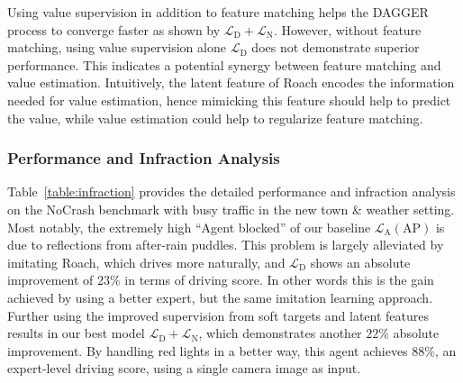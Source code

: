 Using value supervision in addition to feature matching helps the DAGGER process to converge faster as shown by $\mathcal{L}_\text{D} + \mathcal{L}_\text{N}$.
However, without feature matching, using value supervision alone $\mathcal{L}_\text{D}$ does not demonstrate superior performance.
This indicates a potential synergy between feature matching and value estimation.
Intuitively, the latent feature of Roach encodes the information needed for value estimation, hence mimicking this feature should help to predict the value,
while value estimation could help to regularize feature matching.


%


\subsubsection{Performance and Infraction Analysis}

\hspace{1pc}Table~\ref{table:infraction} provides the detailed performance and infraction analysis on the NoCrash benchmark with busy traffic in the new town \& weather setting.
Most notably, the extremely high ``Agent blocked'' of our baseline $\mathcal{L}_\text{A}(\text{AP})$ is due to reflections from after-rain puddles.
This problem is largely alleviated by imitating Roach, which drives more naturally, and $\mathcal{L}_\text{D}$ shows an absolute improvement of $23\%$ in terms of driving score.
In other words this is the gain achieved by using a better expert, but the same imitation learning approach. 
Further using the improved supervision from soft targets and latent features results in our best model $\mathcal{L}_\text{D}+\mathcal{L}_\text{N}$, which demonstrates another $22\%$ absolute improvement.
By handling red lights in a better way, this agent achieves $88\%$, an expert-level driving score, using a single camera image as input.



 